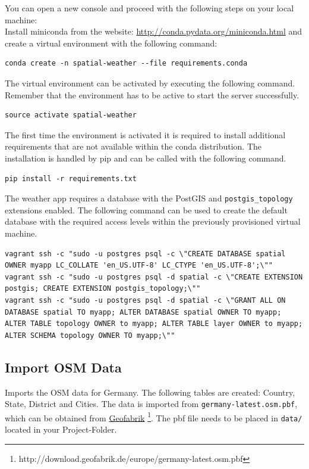 \documentclass[paper=a4, fontsize=11pt]{article} %
\numberwithin{equation}{section} %
\numberwithin{figure}{section} %
\numberwithin{table}{section} %
\begin{document}
You can open a new console and proceed with the following steps on your local machine:\\
Install miniconda from the website:
\url{http://conda.pydata.org/miniconda.html} and create a virtual environment with the following command:

\begin{lstlisting}
conda create -n spatial-weather --file requirements.conda
\end{lstlisting}

The virtual environment can be activated by executing the following command.
Remember that the environment has to be active to start the server successfully.
\begin{lstlisting}
source activate spatial-weather
\end{lstlisting}

The first time the environment is activated it is required to install additional
requirements that are not available within the conda distribution. The installation
is handled by pip and can be called with the following command.
\begin{lstlisting}
pip install -r requirements.txt
\end{lstlisting}

The weather app requires a database with the PostGIS and \texttt{postgis\_topology} extensions enabled.
The following command can be used to create the default database with the required
access levels within the previously provisioned virtual machine.
\begin{lstlisting}[breaklines=true]
vagrant ssh -c "sudo -u postgres psql -c \"CREATE DATABASE spatial OWNER myapp LC_COLLATE 'en_US.UTF-8' LC_CTYPE 'en_US.UTF-8';\""
vagrant ssh -c "sudo -u postgres psql -d spatial -c \"CREATE EXTENSION postgis; CREATE EXTENSION postgis_topology;\""
vagrant ssh -c "sudo -u postgres psql -d spatial -c \"GRANT ALL ON DATABASE spatial TO myapp; ALTER DATABASE spatial OWNER TO myapp; ALTER TABLE topology OWNER to myapp; ALTER TABLE layer OWNER to myapp; ALTER SCHEMA topology OWNER TO myapp;\""
\end{lstlisting}

\subsection{Import OSM Data}\label{import-osm-data}

Imports the OSM data for Germany. The following tables are created: Country, State, District and Cities. The data is imported from \texttt{germany-latest.osm.pbf}, which can be obtained from \href{http://download.geofabrik.de/europe/germany-latest.osm.pbf}{Geofabrik} \footnote{http://download.geofabrik.de/europe/germany-latest.osm.pbf}. The pbf file needs to be placed in \texttt{data/} located in your Project-Folder.
\end{document}
